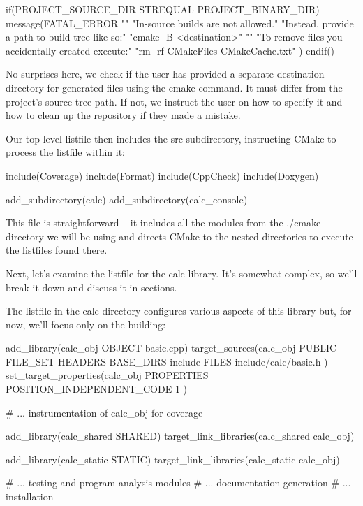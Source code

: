 \begin{cmake}
if(PROJECT_SOURCE_DIR STREQUAL PROJECT_BINARY_DIR)
    message(FATAL_ERROR
        "\n"
        "In-source builds are not allowed.\n"
        "Instead, provide a path to build tree like so:\n"
        "cmake -B <destination>\n"
        "\n"
        "To remove files you accidentally created execute:\n"
        "rm -rf CMakeFiles CMakeCache.txt\n"
    )
endif()
\end{cmake}

No surprises here, we check if the user has provided a separate destination directory for generated files using the cmake command. It must differ from the project’s source tree path. If not, we instruct the user on how to specify it and how to clean up the repository if they made a mistake.

Our top-level listfile then includes the src subdirectory, instructing CMake to process the listfile within it:


\begin{cmake}
include(Coverage)
include(Format)
include(CppCheck)
include(Doxygen)

add_subdirectory(calc)
add_subdirectory(calc_console)
\end{cmake}

This file is straightforward – it includes all the modules from the ./cmake directory we will be using and directs CMake to the nested directories to execute the listfiles found there.

Next, let’s examine the listfile for the calc library. It’s somewhat complex, so we’ll break it down and discuss it in sections.


The listfile in the calc directory configures various aspects of this library but, for now, we’ll focus only on the building:


\begin{cmake}
add_library(calc_obj OBJECT basic.cpp)
target_sources(calc_obj
               PUBLIC FILE_SET HEADERS
               BASE_DIRS include
               FILES include/calc/basic.h
)
set_target_properties(calc_obj PROPERTIES
    POSITION_INDEPENDENT_CODE 1
)

# ... instrumentation of calc_obj for coverage

add_library(calc_shared SHARED)
target_link_libraries(calc_shared calc_obj)

add_library(calc_static STATIC)
target_link_libraries(calc_static calc_obj)

# ... testing and program analysis modules
# ... documentation generation
# ... installation
\end{cmake}

